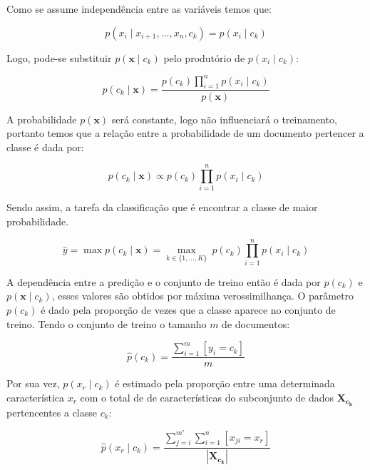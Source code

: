 Como se assume independência entre as variáveis temos que:

\begin{equation}
    p(x_i \mid x_{i+1}, \dots ,x_{n}, c_k ) = p(x_i \mid c_k)
\end{equation}

Logo, pode-se substituir $p(\mathbf{x} \mid c_k)$ pelo produtório de
$p(x_i \mid c_k)$:

\begin{equation}
    p(c_k \mid \mathbf{x}) = \frac{p(c_k) \prod_{i=1}^n p(x_i \mid c_k)}{p(\mathbf{x})}
\end{equation}

A probabilidade $p(\mathbf{x})$ será constante, logo não influenciará o
treinamento, portanto temos que a relação entre a probabilidade de um documento
pertencer a classe é dada por:

\begin{equation}
    p(c_k \mid \mathbf{x}) \propto p(c_k) \prod_{i=1}^n p(x_i \mid c_k)
\end{equation}

Sendo assim, a tarefa da classificação que é encontrar a classe de maior
probabilidade.

\begin{equation}
    \hat{y} = \operatorname{max} p(c_k \mid \mathbf{x}) = \underset{k \in \{1, \dots, K\}}{\operatorname{max}} \ p(c_k) \displaystyle\prod_{i=1}^n p(x_i \mid c_k)
\end{equation}

A dependência entre a predição e o conjunto de treino então é dada por $p(c_k)$
e $p(\mathbf{x} \mid c_k)$, esses valores são obtidos por máxima verossimilhança.
O parâmetro $p(c_k)$ é dado pela proporção de vezes que a classe aparece no
conjunto de treino.
Tendo o conjunto de treino o tamanho $m$ de documentos:

\begin{equation}
    \hat{p}(c_k) = \frac{\sum_{i=1}^m [y_i = c_k]}{m}
\end{equation}

Por sua vez, $p(x_r \mid c_k)$ é estimado pela proporção entre uma determinada
característica $x_r$ com o total de de características do subconjunto de dados
$\mathbf{X_{c_k}}$ pertencentes a classe $c_k$:

\begin{equation}
    \hat{p}(x_r \mid c_k) = \frac{\sum_{j=i}^{m'} \sum_{i=1}^n [x_{ji} = x_r]}{|\mathbf{X_{c_k}}|}
\end{equation}

